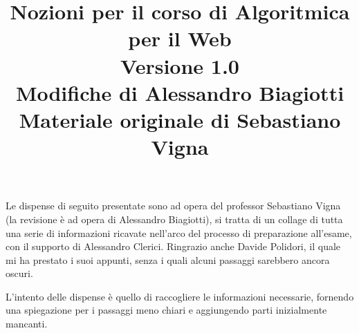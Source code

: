 \documentclass{article}
\title{
    Nozioni per il corso di Algoritmica per il Web\\ 
    \large{Versione 1.0}\\ \vspace{0.5cm}
    \large{Modifiche di Alessandro Biagiotti}\\ \vspace{1cm}
    \large{Materiale originale di Sebastiano Vigna}
}
\date{}
\begin{document}
\maketitle
\clearpage
\tableofcontents
\clearpage
\noindent Le dispense di seguito presentate sono ad opera del professor Sebastiano Vigna (la
revisione è ad opera di Alessandro Biagiotti), si tratta di un collage di tutta una serie di
informazioni ricavate nell'arco del processo di preparazione all'esame, con il supporto di
Alessandro Clerici. Ringrazio anche Davide Polidori, il quale mi ha prestato i suoi appunti, senza i
quali alcuni passaggi sarebbero ancora oscuri.

L'intento delle dispense è quello di raccogliere le informazioni necessarie, fornendo una spiegazione per i passaggi meno chiari e aggiungendo parti inizialmente mancanti.













\end{document}
